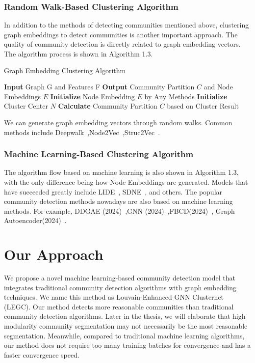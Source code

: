 \documentclass[ %
                    author={Tengyao Tu},
                supervisor={Dr. James Pope},
                    degree={MSc},
                     title={A New Perspective on Graph Community Detection: Combining Traditional Methods with Deep Learning Approaches},
                  subtitle={Applying to Telecom Networks and Diverse Datasets},
                      type={},
                      year={2024}]{dissertation}
\begin{document}
\subsubsection{Random Walk-Based Clustering Algorithm}
In addition to the methods of detecting communities mentioned above, clustering graph embeddings to detect communities is another important approach. The quality of community detection is directly related to graph embedding vectors. The algorithm process is shown in Algorithm 1.3.
\begin{algorithm}
\caption{Graph Embedding Clustering Algorithm}
\begin{framedalgorithm}[ht!]
    \State \textbf{Input} Graph G and Features F\newline
    \State \textbf{Output} Community Partition $C$ and Node Embeddings $E$\newline
    \State \textbf{Initialize} Node Embedding $E$ by Any Methods\newline
    \State \textbf{Initialize} Cluster Center $N$\newline
    \State \textbf{Calculate} Community Partition $C$ based on Cluster Result \newline
\end{framedalgorithm}
\end{algorithm}
We can generate graph embedding vectors through random walks. Common methods include Deepwalk~\cite{perozzi2014deepwalk},Node2Vec~\cite{grover2016node2vec},Struc2Vec~\cite{ribeiro2017struc2vec}.
\subsubsection{Machine Learning-Based Clustering Algorithm}
The algorithm flow based on machine learning is also shown in Algorithm 1.3, with the only difference being how Node Embeddings are generated. Models that have succeeded greatly include LIDE~\cite{chou2019local}, SDNE~\cite{wang2016structural}, and others. The popular community detection methods nowadays are also based on machine learning methods. For example, DDGAE (2024)~\cite{wu2024deep},GNN (2024)~\cite{liu2024community},FBCD(2024)~\cite{liu2024community}, Graph Autoencoder(2024)~\cite{jie2024overlapping}.
\section{Our Approach}
We propose a novel machine learning-based community detection model that integrates traditional community detection algorithms with graph embedding techniques. We name this method as Louvain-Enhanced GNN Clusternet (LEGC). Our method detects more reasonable communities than traditional community detection algorithms. Later in the thesis, we will elaborate that high modularity community segmentation may not necessarily be the most reasonable segmentation. Meanwhile, compared to traditional machine learning algorithms, our method does not require too many training batches for convergence and has a faster convergence speed.
\end{document}
